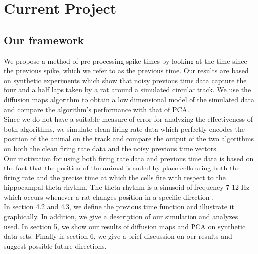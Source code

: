 
\section{Current Project}

\subsection{Our framework}

We propose a method of pre-processing spike times by looking at the time since the previous spike, which we refer to as the previous time.  Our results are based on synthetic experiments which show  that noisy previous time data  capture  the  four and a half laps taken by a rat  around a simulated circular track.  We use the diffusion maps algorithm \cite{coifman2006diffusion}  to obtain a low dimensional model of the simulated data and compare the algorithm's performance with that of PCA.\\

Since we do not have  a suitable measure of error for  analyzing the effectiveness of both algorithms, we simulate clean
firing rate data which perfectly encodes the position of the animal on the track and compare the output of the  two
algorithms on both the clean firing rate data and the noisy previous time vectors.\\

Our motivation for using both  firing rate data  and previous time data  is based on the fact that the position of the animal is coded by place cells using both the firing rate and the precise time at which the cells fire with respect to the hippocampal theta rhythm. The theta rhythm is a sinusoid of frequency 7-12 Hz which occurs whenever a rat changes position in  a specific direction \cite{OKeefe1971, Burgess1993}.\\


In section  4.2 and 4.3,  we define the previous time function and illustrate it graphically.  In addition, we give a description of our simulation and analyzes used. In section 5, we show our results of diffusion maps and PCA on synthetic data sets.
Finally in section 6, we give a brief discussion on our results and suggest possible future directions.



